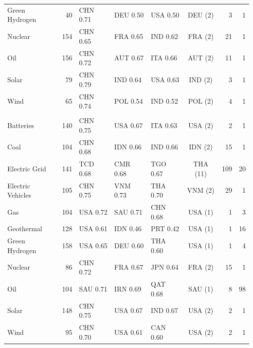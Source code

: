 \begin{table}[tbp]
\begin{threeparttable}
\begin{tabular}{@{}lrlllcrr@{}}
Green Hydrogen & 40 & CHN 0.71 & DEU 0.50 & USA 0.50 & DEU (2) & 3 & 1 \\
Nuclear & 154 & CHN 0.65 & FRA 0.65 & IND 0.62 & FRA (2) & 21 & 1 \\
Oil & 156 & CHN 0.72 & AUT 0.67 & ITA 0.66 & AUT (2) & 11 & 1 \\
Solar & 79 & CHN 0.79 & IND 0.64 & USA 0.63 & IND (2) & 3 & 1 \\
Wind & 65 & CHN 0.74 & POL 0.54 & IND 0.52 & POL (2) & 4 & 1 \\
\addlinespace
\multicolumn{8}{@{}l}{\textit{Downstream}}\\
Batteries & 140 & CHN 0.75 & USA 0.67 & ITA 0.63 & USA (2) & 2 & 1 \\
Coal & 104 & CHN 0.68 & IDN 0.66 & IND 0.66 & IDN (2) & 15 & 1 \\
Electric Grid & 141 & TCD 0.68 & CMR 0.68 & TGO 0.67 & THA (11) & 109 & 20 \\
Electric Vehicles & 105 & CHN 0.75 & VNM 0.73 & THA 0.70 & VNM (2) & 29 & 1 \\
Gas & 104 & USA 0.72 & SAU 0.71 & CHN 0.68 & USA (1) & 1 & 3 \\
Geothermal & 128 & USA 0.61 & IDN 0.46 & PRT 0.42 & USA (1) & 1 & 16 \\
Green Hydrogen & 158 & USA 0.65 & DEU 0.60 & THA 0.60 & USA (1) & 1 & 4 \\
Nuclear & 86 & CHN 0.72 & FRA 0.67 & JPN 0.64 & FRA (2) & 15 & 1 \\
Oil & 104 & SAU 0.71 & IRN 0.69 & QAT 0.68 & SAU (1) & 8 & 98 \\
Solar & 148 & CHN 0.75 & USA 0.67 & IND 0.67 & USA (2) & 2 & 1 \\
Wind & 95 & CHN 0.70 & USA 0.61 & CAN 0.60 & USA (2) & 2 & 1 \\
\bottomrule
\end{tabular}
\begin{tablenotes}[flushleft]\footnotesize

\end{tablenotes}
\end{threeparttable}
\end{table}
